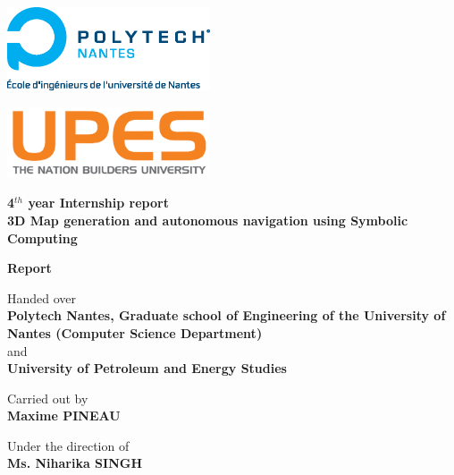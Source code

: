
\begin{titlepage}	%

\begin{center}


\begin{minipage}[t]{0.48\textwidth}
	\begin{flushleft}
		\includegraphics [width=60mm]{images/logo_ecoles/Polytech_Nantes_Universite} \\[0.5cm]
	\end{flushleft}
\end{minipage}
\begin{minipage}[t]{0.48\textwidth}
	\begin{flushright}
		\includegraphics [width=60mm]{images/upes} \\[0.5cm]
	\end{flushright}
\end{minipage} 

\vfill

\Huge{\textbf{4$^{th}$ year Internship report}} \\
\huge{\textbf{3D Map generation and autonomous navigation using Symbolic Computing}}

\vfill 

\huge{\textbf{Report}} 

\vfill

\Large{Handed over} \\
\LARGE{\textbf{Polytech Nantes, Graduate school of Engineering of the University of Nantes (Computer Science Department)}} \\ 
\Large{and} \\
\LARGE{\textbf{University of Petroleum and Energy Studies}}


\vfill 


\begin{minipage}[t]{0.3\textwidth}
	\begin{center}
		\Large{Carried out by} \\
		\Large{\textbf{Maxime PINEAU}} 
	\end{center}
\end{minipage}
\begin{minipage}[t]{0.3\textwidth}
	\begin{center}
		\Large{Under the direction of} \\
		\Large{\textbf{Ms. Niharika SINGH}} 
	\end{center}
\end{minipage} 



\end{center}
\end{titlepage}
